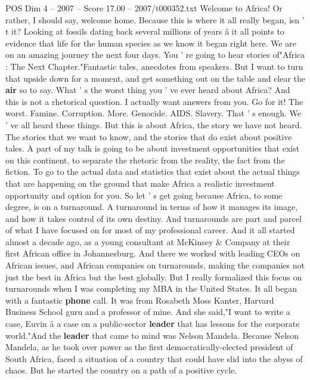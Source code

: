 \begin{textsample}{POS Dim 4 – 2007 – Score 17.00 – 2007/t000352.txt}  \label{ex:f4_pos_020}
Welcome to Africa!
Or rather, I should say, welcome home.
Because this is where it all really began, isn ' t it?
Looking at fossils dating back several millions of years â it all points to evidence that life for the human species as we know it began right here.
We are on an amazing journey the next four days.
You ' re going to hear stories of"Africa : The Next Chapter."Fantastic tales, anecdotes from speakers.
But I want to turn that upside down for a moment, and get something out on the table and clear the \textbf{air} so to say.
What ' s the worst thing you ' ve ever heard about Africa?
And this is not a rhetorical question.
I actually want answers from you.
Go for it!
The worst.
Famine.
Corruption.
More.
Genocide.
AIDS.
Slavery.
That ' s enough.
We ' ve all heard these things.
But this is about Africa, the story we have not heard.
The stories that we want to know, and the stories that do exist about positive tales.
A part of my talk is going to be about investment opportunities that exist on this continent, to separate the rhetoric from the reality, the fact from the fiction.
To go to the actual data and statistics that exist about the actual things that are happening on the ground that make Africa a realistic investment opportunity and option for you.
So let ' s get going because Africa, to some degree, is on a turnaround.
A turnaround in terms of how it manages its image, and how it takes control of its own destiny.
And turnarounds are part and parcel of what I have focused on for most of my professional career.
And it all started almost a decade ago, as a young consultant at McKinsey \& Company at their first African office in Johannesburg.
And there we worked with leading CEOs on African issues, and African companies on turnarounds, making the companies not just the best in Africa but the best globally.
But I really formalized this focus on turnarounds when I was completing my MBA in the United States.
It all began with a fantastic \textbf{phone} call.
It was from Rosabeth Moss Kanter, Harvard Business School guru and a professor of mine.
And she said,"I want to write a case, Euvin â a case on a public-sector \textbf{leader} that has lessons for the corporate world."And the \textbf{leader} that came to mind was Nelson Mandela.
Because Nelson Mandela, as he took over power as the first democratically-elected president of South Africa, faced a situation of a country that could have slid into the abyss of chaos.
But he started the country on a path of a positive cycle.

\end{textsample}
